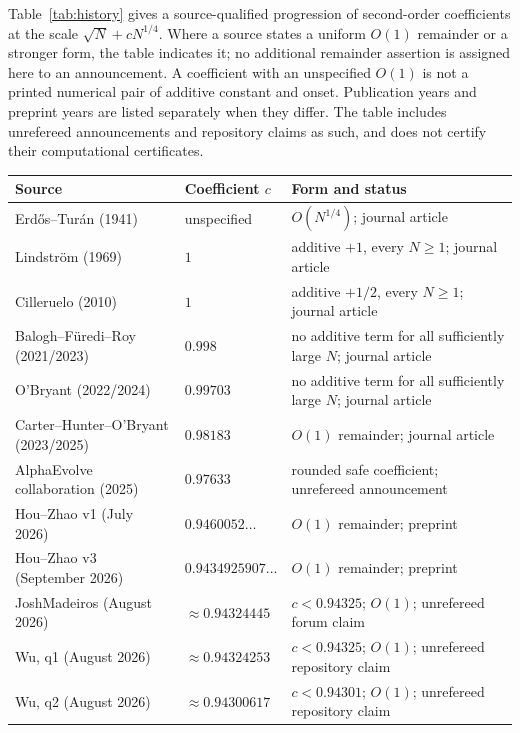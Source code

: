 \documentclass[10pt]{article}
\numberwithin{equation}{section}
\theoremstyle{remark}
\begin{document}
Table~\ref{tab:history} gives a source-qualified progression of second-order
coefficients at the scale $\sqrt N+cN^{1/4}$. Where a source states a
uniform $O(1)$ remainder or a stronger form, the table indicates it;
no additional remainder assertion is assigned here to an announcement.
A coefficient with an unspecified $O(1)$ is not a printed numerical pair
of additive constant and onset. Publication years and preprint years are
listed separately when they differ. The table includes unrefereed
announcements and repository claims as such, and does not certify their
computational certificates.

\begin{table}[ht]
\centering\small
\begin{tabular}{@{}p{}p{}p{}@{}}
\toprule
Source & Coefficient $c$ & Form and status\\
\midrule
Erd\H{o}s--Tur\'an (1941)~\cite{ET41}
& unspecified & $O(N^{1/4})$; journal article\\
Lindstr\"om (1969)~\cite{Lind69}
& $1$ & additive $+1$, every $N\ge1$; journal article\\
Cilleruelo (2010)~\cite{Cil10}
& $1$ & additive $+1/2$, every $N\ge1$; journal article\\
Balogh--F\"uredi--Roy (2021/2023)~\cite{BFR23}
& $0.998$ & no additive term for all sufficiently large $N$; journal article\\
O'Bryant (2022/2024)~\cite{OB24}
& $0.99703$ & no additive term for all sufficiently large $N$; journal article\\
Carter--Hunter--O'Bryant (2023/2025)~\cite{CHO25}
& $0.98183$ & $O(1)$ remainder; journal article\\
AlphaEvolve collaboration (2025)~\cite{AE25}
& $0.97633$ & rounded safe coefficient; unrefereed announcement\\
Hou--Zhao v1 (July 2026)~\cite{HZ26}
& $0.9460052\ldots$ & $O(1)$ remainder; preprint\\
Hou--Zhao v3 (September 2026)~\cite{HZ26}
& $0.9434925907\ldots$ & $O(1)$ remainder; preprint\\
JoshMadeiros (August 2026)~\cite{Josh26}
& $\approx0.94324445$ & $c<0.94325$; $O(1)$; unrefereed forum claim\\
Wu, q1 (August 2026)~\cite{Wu26}
& $\approx0.94324253$ & $c<0.94325$; $O(1)$; unrefereed repository claim\\
Wu, q2 (August 2026)~\cite{Wu26}
& $\approx0.94300617$ & $c<0.94301$; $O(1)$; unrefereed repository claim\\

\end{tabular}
\end{table}
\end{document}
